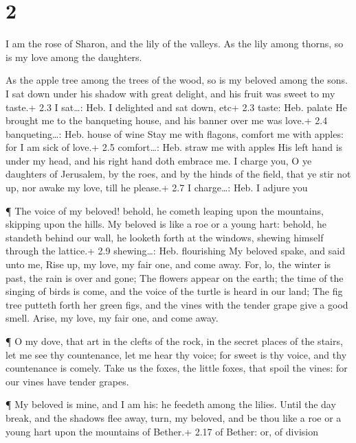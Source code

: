\hypertarget{section-1}{%
\section{2}\label{section-1}}

 I am the rose of Sharon, and the lily of the valleys.
 As the lily among thorns, so is my love among the
daughters.

 As the apple tree among the trees of the wood, so is my
beloved among the sons. I sat down under his shadow with great delight,
and his fruit was sweet to my taste.+ 2.3 I sat\ldots: Heb. I delighted
and sat down, etc+ 2.3 taste: Heb. palate  He brought me to
the banqueting house, and his banner over me was love.+ 2.4
banqueting\ldots: Heb. house of wine  Stay me with flagons,
comfort me with apples: for I am sick of love.+ 2.5 comfort\ldots: Heb.
straw me with apples  His left hand is under my head, and
his right hand doth embrace me.  I charge you, O ye
daughters of Jerusalem, by the roes, and by the hinds of the field, that
ye stir not up, nor awake my love, till he please.+ 2.7 I charge\ldots:
Heb. I adjure you

 ¶ The voice of my beloved! behold, he cometh leaping upon
the mountains, skipping upon the hills.  My beloved is like
a roe or a young hart: behold, he standeth behind our wall, he looketh
forth at the windows, shewing himself through the lattice.+ 2.9
shewing\ldots: Heb. flourishing  My beloved spake, and said
unto me, Rise up, my love, my fair one, and come away. 
For, lo, the winter is past, the rain is over and gone; 
The flowers appear on the earth; the time of the singing of birds is
come, and the voice of the turtle is heard in our land; 
The fig tree putteth forth her green figs, and the vines with the tender
grape give a good smell. Arise, my love, my fair one, and come away.

 ¶ O my dove, that art in the clefts of the rock, in the
secret places of the stairs, let me see thy countenance, let me hear thy
voice; for sweet is thy voice, and thy countenance is comely.
 Take us the foxes, the little foxes, that spoil the vines:
for our vines have tender grapes.

 ¶ My beloved is mine, and I am his: he feedeth among the
lilies.  Until the day break, and the shadows flee away,
turn, my beloved, and be thou like a roe or a young hart upon the
mountains of Bether.+ 2.17 of Bether: or, of division

